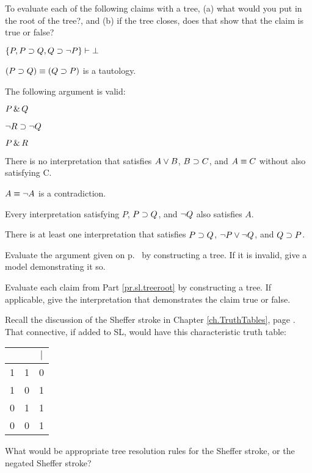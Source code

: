 \solutions
\problempart 
\label{pr.sl.treeroot}
To evaluate each of the following claims with a tree, (a) what would you put in the root of the tree?, and (b) if the tree closes, does that show that the claim is true or false?
\begin{earg}
\item $\{P, P \supset Q, Q \supset \neg P\} \vdash{}\bot$
\item $(P \supset Q) \equiv (Q \supset P)$ is a tautology.
\item The following argument is valid:
	\begin{ekey}
		\item[] $P \,\&\, Q$
		\item[] $\neg R \supset \neg Q$
		\item[\therefore] $P \,\&\, R$
	\end{ekey}
\item There is no interpretation that satisfies $A \vee B$, $B \supset C$, and $A \equiv C$ without also satisfying C.
\item $A \equiv \neg A$ is a contradiction.
\item Every interpretation satisfying $P$, $P \supset Q$, and $\neg Q$ also satisfies $A$.
\item There is at least one interpretation that satisfies $P \supset Q$, $\neg P \vee \neg Q$, and $Q \supset P$.
 \end{earg}

\solutions
\problempart 
\label{pr.sl.agtree}
Evaluate the argument given on p.\ \pageref{8letterargument} by constructing a tree. If it is invalid, give a model demonstrating it so.

\solutions
\problempart Evaluate each claim from Part \ref{pr.sl.treeroot} by constructing a tree. If applicable, give the interpretation that demonstrates the claim true or false.
\label{tree.examples}

\problempart Recall the discussion of the Sheffer stroke in Chapter \ref{ch.TruthTables}, page \pageref{pr.altConnectives}.  That connective, if added to SL, would have this characteristic truth table:

\begin{center}
\begin{tabular}{c|c|c}
\metaA{} & \metaB{} & \metaA{}$|$\metaB{}\\
\hline
1 & 1 & 0\\
1 & 0 & 1\\
0 & 1 & 1\\
0 & 0 & 1
\end{tabular}
\end{center}

What would be appropriate tree resolution rules for the Sheffer stroke, or the negated Sheffer stroke?
